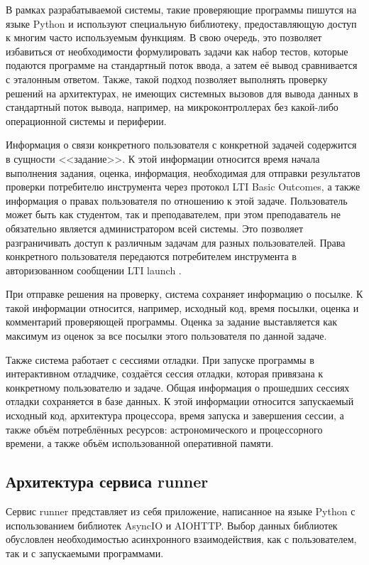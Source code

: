 \documentclass[a4paper,article,14pt]{extarticle}
\begin{document}
В рамках разрабатываемой системы, такие проверяющие программы пишутся на языке Python и используют специальную библиотеку, предоставляющую доступ к многим часто используемым функциям. В свою очередь, это позволяет избавиться от необходимости формулировать задачи как набор тестов, которые подаются программе на стандартный поток ввода, а затем её вывод сравнивается с эталонным ответом. Также, такой подход позволяет выполнять проверку решений на архитектурах, не имеющих системных вызовов для вывода данных в стандартный поток вывода, например, на микроконтроллерах без какой-либо операционной системы и периферии.

Информация о связи конкретного пользователя с конкретной задачей содержится в сущности <<задание>>. К этой информации относится время начала выполнения задания, оценка, информация, необходимая для отправки результатов проверки потребителю инструмента через протокол LTI Basic Outcomes, а также информация о правах пользователя по отношению к этой задаче. Пользователь может быть как студентом, так и преподавателем, при этом преподаватель не обязательно является администратором всей системы. Это позволяет разграничивать доступ к различным задачам для разных пользователей. Права конкретного пользователя передаются потребителем инструмента в авторизованном сообщении LTI launch \cite{lti}.

При отправке решения на проверку, система сохраняет информацию о посылке. К такой информации относится, например, исходный код, время посылки, оценка и комментарий проверяющей программы. Оценка за задание выставляется как максимум из оценок за все посылки этого пользователя по данной задаче.

Также система работает с сессиями отладки. При запуске программы в интерактивном отладчике, создаётся сессия отладки, которая привязана к конкретному пользователю и задаче. Общая информация о прошедших сессиях отладки сохраняется в базе данных. К этой информации относится запускаемый исходный код, архитектура процессора, время запуска и завершения сессии, а также объём потреблённых ресурсов: астрономического и процессорного времени, а также объём использованной оперативной памяти.

\subsection{Архитектура сервиса runner}

Сервис runner представляет из себя приложение, написанное на языке Python с использованием библиотек AsyncIO и AIOHTTP. Выбор данных библиотек обусловлен необходимостью асинхронного взаимодействия, как с пользователем, так и с запускаемыми программами.
\end{document}
